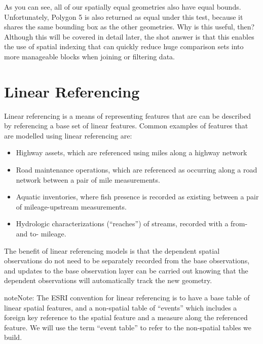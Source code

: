 \documentclass[a4paper,11pt,english]{sphinxmanual}
\begin{document}
As you can see, all of our spatially equal geometries also have equal bounds.  Unfortunately, Polygon 5 is also returned as equal under this test, because it shares the same bounding box as the other geometries.  Why is this useful, then?  Although this will be covered in detail later, the shot answer is that this enables the use of spatial indexing that can quickly reduce huge comparison sets into more manageable blocks when joining or filtering data.


\section{Linear Referencing}
\label{\detokenize{advanced:linear-referencing}}\label{\detokenize{advanced:id5}}
Linear referencing is a means of representing features that are can be described by referencing a base set of linear features. Common examples of features that are modelled using linear referencing are:
\begin{itemize}
\item {} 
Highway assets, which are referenced using miles along a highway network

\item {} 
Road maintenance operations, which are referenced as occurring along a road network between a pair of mile measurements.

\item {} 
Aquatic inventories, where fish presence is recorded as existing between a pair of mileage-upstream measurements.

\item {} 
Hydrologic characterizations (“reaches”) of streams, recorded with a from- and to- mileage.

\end{itemize}

The benefit of linear referencing models is that the dependent spatial observations do not need to be separately recorded from the base observations, and updates to the base observation layer can be carried out knowing that the dependent observations will automatically track the new geometry.

\begin{sphinxadmonition}{note}{Note:}
The ESRI convention for linear referencing is to have a base table of linear spatial features, and a non-spatial table of “events” which includes a foreign key reference to the spatial feature and a measure along the referenced feature. We will use the term “event table” to refer to the non-spatial tables we build.
\end{sphinxadmonition}
\end{document}
